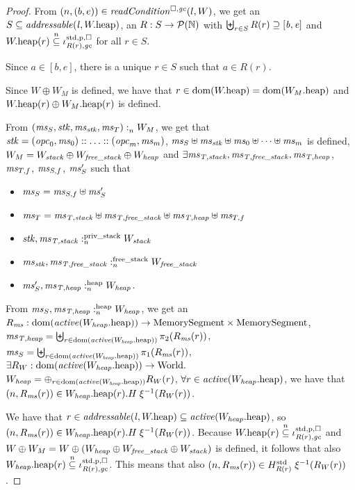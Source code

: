 \begin{proof}
  From $\npair{(b,e)}\in\readCond{l,W}$, we get an $S \subseteq \addressable{\lin,
    \pwheap}$, an $R : S \rightarrow \powerset{\nats}$ with $\biguplus_{r \in S} R(r) \supseteq [\baddr,\eaddr]$ and $\pwheap(r)
  \nsubeq \stdreg{R(r),\gc}{\pur}$ for all $r \in S$.

  Since $a \in [b,e]$, there is a unique $r \in S$ such that $a \in R(r)$.

  Since $W \oplus W_M$ is defined, we have that $r \in \dom(\pwheap) =
  \dom(\pwheap[W_M])$ and $\pwheap(r) \oplus \pwheap[W_M](r)$ is defined.

  From $\memSat{(\ms_S,\stk,\ms_\stk,\ms_T)}{W_M}$, we get that
  $\stk = (\opc_0,\ms_0):: \dots :: (\opc_m,\ms_m)$,
  $\ms_S \uplus \ms_\stk \uplus \ms_0 \uplus \dots \uplus \ms_m$ is defined,
  $W_M = W_{\var{stack}} \oplus W_{\var{free\_stack}} \oplus W_{\var{heap}}$ and
  $\exists \ms_\var{T,stack}, \ms_\var{T,free\_stack}, \ms_\var{T,heap}$, $\ms_{T,f}$, $\ms_{S,f}$, $\ms_S'$ such that
  \begin{itemize}
  \item $\ms_S =\ms_{S,f} \uplus \ms_S'$
  \item $\ms_T = \ms_\var{T,stack} \uplus \ms_\var{T,free\_stack} \uplus
    \ms_\var{T,heap} \uplus \ms_{T,f}$
  \item $\memSatStack{\stk,\ms_\var{T,stack}}{W_{\var{stack}}}$
  \item $\memSatFStack{\ms_\stk,\ms_\var{T,free\_stack}}{W_{\var{free\_stack}}}$
  \item $\memSatHeap{\ms_S',\ms_\var{T,heap}}{W_\var{heap}}$.
  \end{itemize}

  From $\memSatHeap{\ms_S,\ms_\var{T,heap}}{W_\var{heap}}$, we get an
  $R_\ms : \dom(\activeReg{\pwheap[W_\var{heap}]}) \fun \MemSeg \times \MemSeg$,
  $\ms_\var{T,heap} = \biguplus_{r \in \dom(\activeReg{\pwheap[W_\var{heap}]})} \pi_2(R_\ms(r))$,
  $\ms_S = \biguplus_{r \in \dom(\activeReg{\pwheap[W_\var{heap}]})} \pi_1(R_\ms(r))$,
  $\exists R_W : \dom(\activeReg{\pwheap[W_\var{heap}]}) \fun \World\ldotp$
  $W_\var{heap} = \oplus_{r \in \dom(\activeReg{\pwheap[W_\var{heap}]})} R_W(r)$,
  $\forall r \in \activeReg{\pwheap[W_\var{heap}]}$, we have that
  $\npair{R_\ms(r)} \in  \pwheap[W_\var{heap}](r).H \; \xi^{-1}(R_W(r))$.

  We have that $r \in \addressable{\lin, \pwheap} \subseteq
  \activeReg{\pwheap[W_\var{heap}]}$, so $\npair{R_\ms(r)} \in
  \pwheap[W_\var{heap}](r).H \; \xi^{-1}(R_W(r))$.
  Because $\pwheap(r) \nsubeq \stdreg{R(r),\gc}{\pur}$ and $W\oplus W_M = W \oplus (W_\var{heap} \oplus W_\var{free\_stack} \oplus W_\var{stack})$ is defined, it follows that
  also $\pwheap[W_\var{heap}](r) \nsubeq \stdreg{R(r),\gc}{\pur}$. This
  means that also $\npair{R_\ms(r)} \in
  H^{\mathrm{std}}_{R(r)}\; \xi^{-1}(R_W(r))$.


\end{proof}
